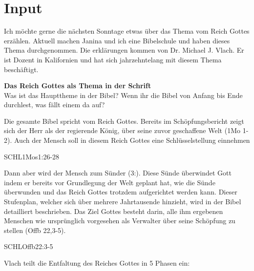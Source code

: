 \documentclass{../../inc/mybib}
\begin{document}
\section{ Input }
\begin{spacing}{1.5}    
  \begin{block}[Einleitung]
    Ich möchte gerne die nächsten Sonntage etwas über das Thema vom Reich Gottes erzählen. Aktuell machen Janina und ich eine Bibelschule und haben dieses Thema durchgenommen. Die erklärungen kommen von Dr. Michael J. Vlach. Er ist Dozent in Kalifornien und hat sich jahrzehntelang mit diesem Thema beschäftigt.
    
  \end{block}
  
   \textbf{Das Reich Gottes als Thema in der Schrift}\\
   Was ist das Haupttheme in der Bibel? Wenn ihr die Bibel von Anfang bis Ende durchlest, was fällt einem da auf?

   Die gesamte Bibel spricht vom Reich Gottes. Bereits im Schöpfungsbericht zeigt sich der
   Herr als der regierende König, über seine zuvor geschaffene Welt (1Mo 1-2). Auch der
   Mensch soll in diesem Reich Gottes eine Schlüsselstellung einnehmen   
    \begin{bibelbox}{SCHL}{1Mos}{1:26-28}
      
    \end{bibelbox}
   Dann aber wird der Mensch zum Sünder (3:). Diese Sünde überwindet Gott indem er
   bereits vor Grundlegung der Welt geplant hat, wie die Sünde überwunden und das Reich
   Gottes trotzdem aufgerichtet werden kann. Dieser Stufenplan, welcher sich über mehrere
   Jahrtausende hinzieht, wird in der Bibel detailliert beschrieben.
   Das Ziel Gottes besteht darin, alle ihm ergebenen Menschen wie ursprünglich
   vorgesehen als Verwalter über seine Schöpfung zu stellen (Offb 22,3-5).
   \begin{bibelbox}{SCHL}{Offb}{22:3-5}

   \end{bibelbox}
   Vlach teilt die Entfaltung des Reiches Gottes in 5 Phasen ein:
   

\end{spacing}
\end{document}
